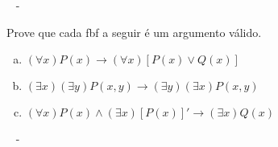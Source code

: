 \documentclass[a4paper, 12pt, addpoints]{exam}
\begin{document}
\begin{questions}
  \begin{resp}~
    - 
  \end{resp}

  \question Prove que cada fbf a seguir é um argumento válido.

    \begin{enumerate}[a.]
      \item $(\forall x)P(x) \rightarrow (\forall x)[P(x) \lor Q(x)]$
      \item $(\exists x)(\exists y)P(x, y) \rightarrow (\exists y)(\exists x)P(x, y)$
      \item $(\forall x)P(x) \land (\exists x)[P(x)]' \rightarrow (\exists x)Q(x)$
  \end{enumerate}

  \begin{resp}~
    - 
  \end{resp}
  
\end{questions}

\vspace{1cm}
\end{document}
